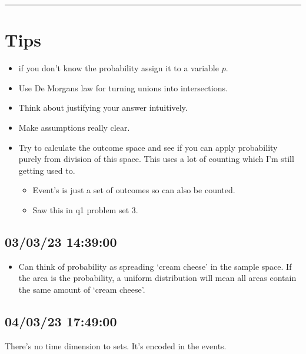 \documentclass[11pt]{article}
\begin{document}
\begin{center}\rule{0.5\linewidth}{\linethickness}\end{center}

\hypertarget{tips}{%
\section{Tips}\label{tips}}

\begin{itemize}
\tightlist
\item
  if you don't know the probability assign it to a variable \(p\).
\item
  Use De Morgans law for turning unions into intersections.
\item
  Think about justifying your answer intuitively.
\item
  Make assumptions really clear.
\item
  Try to calculate the outcome space and see if you can apply
  probability purely from division of this space. This uses a lot of
  counting which I'm still getting used to.

  \begin{itemize}
  \tightlist
  \item
    Event's is just a set of outcomes so can also be counted.
  \item
    Saw this in q1 problem set 3.
  \end{itemize}
\end{itemize}

\hypertarget{section}{%
\subsection{03/03/23 14:39:00}\label{section}}

\begin{itemize}
\tightlist
\item
  Can think of probability as spreading `cream cheese' in the sample
  space. If the area is the probability, a uniform distribution will
  mean all areas contain the same amount of `cream cheese'.
\end{itemize}

\hypertarget{section-1}{%
\subsection{04/03/23 17:49:00}\label{section-1}}

There's no time dimension to sets. It's encoded in the events.
\end{document}
